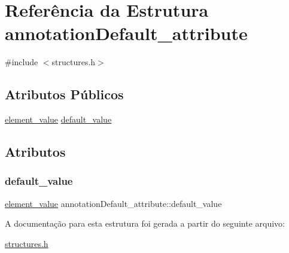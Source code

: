 \hypertarget{structannotationDefault__attribute}{}\section{Referência da Estrutura annotation\+Default\+\_\+attribute}
\label{structannotationDefault__attribute}


{\ttfamily \#include $<$structures.\+h$>$}

\subsection*{Atributos Públicos}
\begin{DoxyCompactItemize}
\item 
\hyperlink{structelement__value}{element\+\_\+value} \hyperlink{structannotationDefault__attribute_a18525b7817b25760609cda9ebaadfbb3}{default\+\_\+value}
\end{DoxyCompactItemize}


\subsection{Atributos}
\mbox{\label{structannotationDefault__attribute_a18525b7817b25760609cda9ebaadfbb3}} 
\subsubsection{\texorpdfstring{default\+\_\+value}{default\_value}}
{\footnotesize\ttfamily \hyperlink{structelement__value}{element\+\_\+value} annotation\+Default\+\_\+attribute\+::default\+\_\+value}



A documentação para esta estrutura foi gerada a partir do seguinte arquivo\+:\begin{DoxyCompactItemize}
\item 
\hyperlink{structures_8h}{structures.\+h}\end{DoxyCompactItemize}

